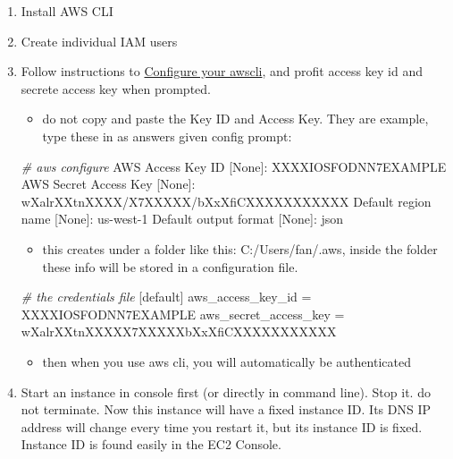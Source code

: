\documentclass[
]{book}
\newenvironment{Shaded}{\begin{snugshade}}{\end{snugshade}}
\newcommand{\CommentTok}[1]{\textcolor[rgb]{0.56,0.35,0.01}{\textit{#1}}}
\newcommand{\ExtensionTok}[1]{#1}
\newcommand{\NormalTok}[1]{#1}
\providecommand{\tightlist}{%
  \setlength{\itemsep}{0pt}\setlength{\parskip}{0pt}}
\begin{document}
\begin{enumerate}
\def\labelenumi{\arabic{enumi}.}
\tightlist
\item
  Install AWS CLI
\item
  Create individual IAM users
\item
  Follow instructions to \href{https://docs.aws.amazon.com/cli/latest/userguide/cli-chap-getting-started.html}{Configure your awscli}, and profit access key id and secrete access key when prompted.

  \begin{itemize}
  \tightlist
  \item
    do not copy and paste the Key ID and Access Key. They are example, type these in as answers given config prompt:
  \end{itemize}

\begin{Shaded}
\begin{Highlighting}[]
\CommentTok{\# aws configure}
\ExtensionTok{AWS}\NormalTok{ Access Key ID [None]: XXXXIOSFODNN7EXAMPLE}
\ExtensionTok{AWS}\NormalTok{ Secret Access Key [None]: wXalrXXtnXXXX/X7XXXXX/bXxXfiCXXXXXXXXXXX}
\ExtensionTok{Default}\NormalTok{ region name [None]: us{-}west{-}1}
\ExtensionTok{Default}\NormalTok{ output format [None]: json}
\end{Highlighting}
\end{Shaded}

  \begin{itemize}
  \tightlist
  \item
    this creates under a folder like this: C:/Users/fan/.aws, inside the folder these info will be stored in a configuration file.
  \end{itemize}

\begin{Shaded}
\begin{Highlighting}[]
\CommentTok{\# the credentials file}
\NormalTok{[}\ExtensionTok{default}\NormalTok{]}
\ExtensionTok{aws\_access\_key\_id}\NormalTok{ = XXXXIOSFODNN7EXAMPLE}
\ExtensionTok{aws\_secret\_access\_key}\NormalTok{ = wXalrXXtnXXXXX7XXXXXbXxXfiCXXXXXXXXXXX}
\end{Highlighting}
\end{Shaded}

  \begin{itemize}
  \tightlist
  \item
    then when you use aws cli, you will automatically be authenticated
  \end{itemize}
\item
  Start an instance in console first (or directly in command line). Stop it. do not terminate. Now this instance will have a fixed instance ID. Its DNS IP address will change every time you restart it, but its instance ID is fixed. Instance ID is found easily in the EC2 Console.


\end{enumerate}
\end{document}
